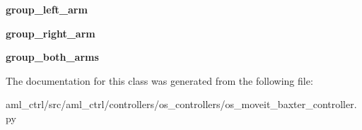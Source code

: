 \begin{DoxyCompactItemize}
\item 
\hypertarget{classaml__ctrl_1_1controllers_1_1os__controllers_1_1os__moveit__baxter__controller_1_1_baxter_move_it_controller_a6750fdc448f782cfbd3bf1859c8e2503}{{\bfseries group\-\_\-left\-\_\-arm}}\label{classaml__ctrl_1_1controllers_1_1os__controllers_1_1os__moveit__baxter__controller_1_1_baxter_move_it_controller_a6750fdc448f782cfbd3bf1859c8e2503}

\item 
\hypertarget{classaml__ctrl_1_1controllers_1_1os__controllers_1_1os__moveit__baxter__controller_1_1_baxter_move_it_controller_afbc743ae405edc5f8974c7b89732aaa7}{{\bfseries group\-\_\-right\-\_\-arm}}\label{classaml__ctrl_1_1controllers_1_1os__controllers_1_1os__moveit__baxter__controller_1_1_baxter_move_it_controller_afbc743ae405edc5f8974c7b89732aaa7}

\item 
\hypertarget{classaml__ctrl_1_1controllers_1_1os__controllers_1_1os__moveit__baxter__controller_1_1_baxter_move_it_controller_a8fa5f00622d9497afe8d8df91a0bbe9f}{{\bfseries group\-\_\-both\-\_\-arms}}\label{classaml__ctrl_1_1controllers_1_1os__controllers_1_1os__moveit__baxter__controller_1_1_baxter_move_it_controller_a8fa5f00622d9497afe8d8df91a0bbe9f}

\end{DoxyCompactItemize}


The documentation for this class was generated from the following file\-:\begin{DoxyCompactItemize}
\item 
aml\-\_\-ctrl/src/aml\-\_\-ctrl/controllers/os\-\_\-controllers/os\-\_\-moveit\-\_\-baxter\-\_\-controller.\-py\end{DoxyCompactItemize}
